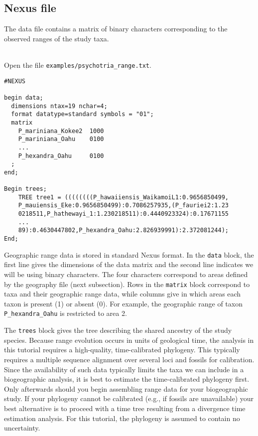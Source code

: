 \subsection{Nexus file}

The data file contains a matrix of binary characters corresponding to the observed ranges of the study taxa.

\noindent \\ \impmark  Open the file \texttt{examples/psychotria\_range.txt}.

\begin{framed}
\begin{lstlisting}
#NEXUS

begin data;
  dimensions ntax=19 nchar=4;
  format datatype=standard symbols = "01";
  matrix
    P_mariniana_Kokee2  1000
    P_mariniana_Oahu    0100
    ...
    P_hexandra_Oahu     0100
  ;
end;

Begin trees;
	TREE tree1 = ((((((((P_hawaiiensis_WaikamoiL1:0.9656850499,
	P_mauiensis_Eke:0.9656850499):0.7086257935,(P_fauriei2:1.23
	0218511,P_hathewayi_1:1.230218511):0.4440923324):0.17671155
	...
	89):0.4630447802,P_hexandra_Oahu:2.826939991):2.372081244);
End;
\end{lstlisting}
\end{framed}

Geographic range data is stored in standard Nexus format.
In the {\tt data} block, the first line gives the dimensions of the data matrix and the second line indicates we will be using binary characters.
The four characters correspond to areas defined by the geography file (next subsection).
Rows in the {\tt matrix} block correspond to taxa and their geographic range data, while columns give in which areas each taxon is present (1) or absent (0).
For example, the geographic range of taxon {\tt P\_hexandra\_Oahu} is restricted to area 2.

The {\tt trees} block gives the tree describing the shared ancestry of the study species.
Because range evolution occurs in units of geological time, the analysis in this tutorial requires a high-quality, time-calibrated phylogeny.
This typically requires a multiple sequence alignment over several loci and fossils for calibration.
Since the availability of such data typically limits the taxa we can include in a biogeographic analysis, it is best to estimate the time-calibrated phylogeny first.
Only afterwards should you begin assembling range data for your biogeographic study.
If your phylogeny cannot be calibrated (e.g., if fossils are unavailable) your best alternative is to proceed with a time tree resulting from a divergence time estimation analysis.
For this tutorial, the phylogeny is assumed to contain no uncertainty.

